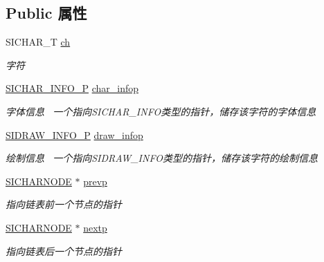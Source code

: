 \subsection*{Public 属性}
\begin{DoxyCompactItemize}
\item 
S\+I\+C\+H\+A\+R\+\_\+T \hyperlink{class_s_i_c_h_a_r_n_o_d_e_a87aabfc0878d7c6cce226256873797e0}{ch}
\begin{DoxyCompactList}\small\item\em 字符 \end{DoxyCompactList}\item 
\hyperlink{class_s_i_c_h_a_r___i_n_f_o}{S\+I\+C\+H\+A\+R\+\_\+\+I\+N\+F\+O\+\_\+P} \hyperlink{class_s_i_c_h_a_r_n_o_d_e_a03e4b28edd8566a6b605f4caeeb7bd6f}{char\+\_\+infop}
\begin{DoxyCompactList}\small\item\em 字体信息~\newline
一个指向\+S\+I\+C\+H\+A\+R\+\_\+\+I\+N\+F\+O类型的指针，储存该字符的字体信息 \end{DoxyCompactList}\item 
\hyperlink{class_s_i_d_r_a_w___i_n_f_o}{S\+I\+D\+R\+A\+W\+\_\+\+I\+N\+F\+O\+\_\+P} \hyperlink{class_s_i_c_h_a_r_n_o_d_e_aee3adfece6b51d9f71a0aa19d203b106}{draw\+\_\+infop}
\begin{DoxyCompactList}\small\item\em 绘制信息~\newline
一个指向\+S\+I\+D\+R\+A\+W\+\_\+\+I\+N\+F\+O类型的指针，储存该字符的绘制信息 \end{DoxyCompactList}\item 
\mbox{\label{class_s_i_c_h_a_r_n_o_d_e_ad4d1b1aee15e867902bbf17938a86e64}} 
\hyperlink{class_s_i_c_h_a_r_n_o_d_e}{S\+I\+C\+H\+A\+R\+N\+O\+DE} $\ast$ \hyperlink{class_s_i_c_h_a_r_n_o_d_e_ad4d1b1aee15e867902bbf17938a86e64}{prevp}
\begin{DoxyCompactList}\small\item\em 指向链表前一个节点的指针 \end{DoxyCompactList}\item 
\mbox{\label{class_s_i_c_h_a_r_n_o_d_e_ab188ae5c7731bcc66a1042defcf158c8}} 
\hyperlink{class_s_i_c_h_a_r_n_o_d_e}{S\+I\+C\+H\+A\+R\+N\+O\+DE} $\ast$ \hyperlink{class_s_i_c_h_a_r_n_o_d_e_ab188ae5c7731bcc66a1042defcf158c8}{nextp}
\begin{DoxyCompactList}\small\item\em 指向链表后一个节点的指针 \end{DoxyCompactList}\end{DoxyCompactItemize}
